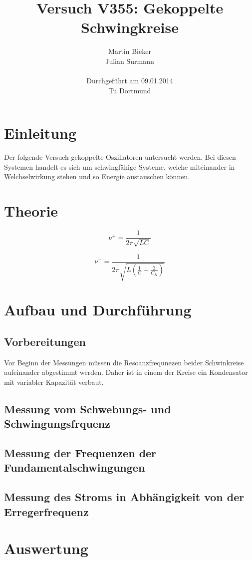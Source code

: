 \documentclass[11pt,ngerman,a4paper]{article}
\title{\textbf{Versuch V355: Gekoppelte Schwingkreise}}
\author{Martin Bieker\\
		Julian Surmann\\
		\\
		Durchgef\"{u}hrt am 09.01.2014\\
		Tu Dortmund}
\date{}
\begin{document}
\renewcommand\tablename{Tabelle}
\renewcommand\figurename{Abbildung}
\maketitle
\thispagestyle{empty}
\newpage
\clearpage
\setcounter{page}{1}


\section{Einleitung}
Der folgende Versuch gekoppelte Oszillatoren untersucht werden. Bei diesen Systemen handelt es sich um schwingfähige Systeme, welche miteinander in Welchselwirkung stehen und so Energie austauschen können. 

\section{Theorie}
\begin{equation}
\nu^+ = \frac{1}{2 \pi \sqrt{LC}}
\end{equation}

\begin{equation}
\nu^- =\frac1{2\pi\sqrt{L(\frac1C + \frac2{C_K})}}
\end{equation}


\section{Aufbau und Durchf\"{u}hrung}
\subsection{Vorbereitungen}
Vor Beginn der Messungen müssen die Resoanzfrequnezen beider Schwinkreise aufeinander abgestimmt werden. Daher ist in einem der Kreise ein Kondensator mit variabler Kapazität verbaut. 
\subsection{Messung vom Schwebungs- und Schwingungsfrquenz}
\subsection{Messung der Frequenzen der Fundamentalschwingungen}
\subsection{Messung des Stroms in Abhängigkeit von der Erregerfrequenz}
\section{Auswertung}
\end{document}
